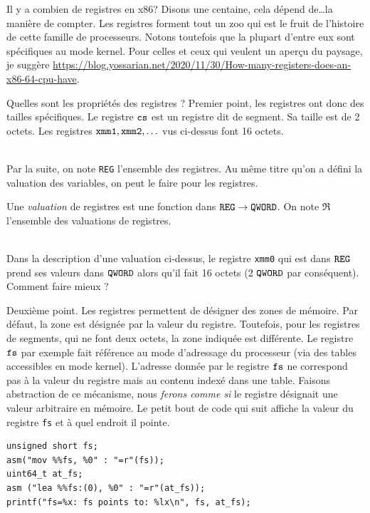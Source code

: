 \documentclass{book}
\newenvironment{commentaire}[1]{%
	\def\FrameCommand{\fboxrule=\FrameRule\fboxsep=\FrameSep \fcolorbox{yellow!50}{yellow!10}}%
	\MakeFramed {\advance\hsize-\width \FrameRestore}
	\noindent {\bf #1}\\
}%
{\endMakeFramed}
\newenvironment{formalisme}[1]{%
	\def\FrameCommand{\fboxrule=\FrameRule\fboxsep=\FrameSep \fcolorbox{red!10}{red!5}}%
	\MakeFramed {\advance\hsize-\width \FrameRestore}
	\noindent {\bf #1}\\
}%
{\endMakeFramed}
\newcommand{\code}[1]{\texttt{#1}}
\newcommand{\rcs}{{\tt cs}\xspace}
\newcommand{\rfs}{{\tt fs}\xspace}
\newcommand{\REG}{{\tt REG}\xspace}
\newcommand{\QWORD}{{\tt QWORD}}
\newcommand{\vReg}{{\mathfrak{R}}}
\begin{document}
Il y a combien de registres en {\sc x86}? Disons une centaine, cela dépend de\ldots la manière de compter. Les registres forment tout un zoo qui est le fruit de l'histoire de cette famille de processeurs. Notons toutefois que la plupart d'entre eux sont spécifiques au mode kernel. Pour celles et ceux qui veulent un aperçu du paysage, je suggère \url{https://blog.yossarian.net/2020/11/30/How-many-registers-does-an-x86-64-cpu-have}.

Quelles sont les propriétés des registres ? Premier point, les registres ont donc des tailles spécifiques. Le registre $\rcs$ est un registre dit de segment. Sa taille est de 2 octets. Les registres ${\tt xmm1}, {\tt xmm2}, \ldots$ vus ci-dessus font 16 octets.

\begin{formalisme}{Modèle des registres}
	Par la suite, on note \REG l'ensemble des registres. Au même titre qu'on a défini la valuation des variables, on peut le faire pour les registres. 
	
	\medskip
	Une \emph{valuation} de registres est une fonction dans $\REG \to \QWORD$. On note $\vReg$ l'ensemble des valuations de registres. 
\end{formalisme}

\begin{commentaire}{Erreur ou imprécision ?}
	Dans la description d'une valuation ci-dessus, le registre {\tt xmm0} qui est dans $\REG$ prend ses valeurs dans $\QWORD$ alors qu'il fait 16 octets (2 $\QWORD$ par conséquent). Comment faire mieux ? 
\end{commentaire}
	
Deuxième point. Les registres permettent de désigner des zones de mémoire. Par défaut, la zone est désignée par la valeur du registre. Toutefois, pour les registres de segments, qui ne font deux octets, la zone indiquée est différente. Le registre $\rfs$ par exemple fait référence au mode d'adressage du processeur (via des tables accessibles en mode kernel). L'adresse  donnée par le registre $\rfs$ ne correspond pas à la valeur du registre mais au contenu indexé dans une table. Faisons abstraction de ce mécanisme, nous \emph{ferons comme si} le registre désignait une valeur arbitraire en mémoire. Le petit bout de code qui suit affiche la valeur du registre \code{fs} et à quel endroit il pointe. 

\begin{verbatim}
unsigned short fs;
asm("mov %%fs, %0" : "=r"(fs));
uint64_t at_fs;
asm ("lea %%fs:(0), %0" : "=r"(at_fs));
printf("fs=%x: fs points to: %lx\n", fs, at_fs);
\end{verbatim}
\end{document}
